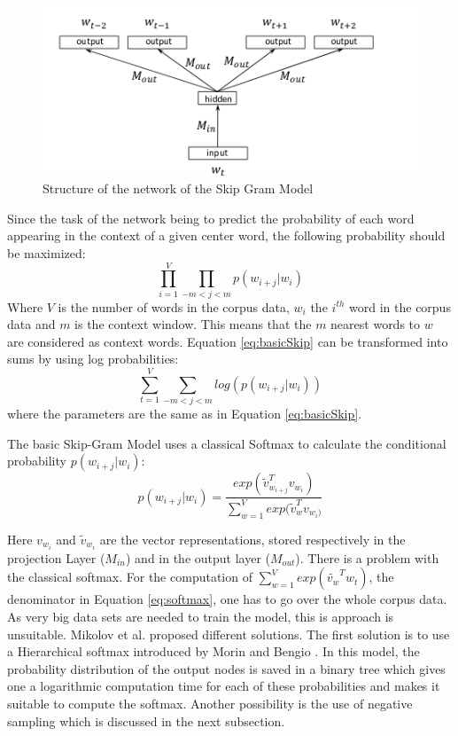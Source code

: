 \begin{figure}[ht]
\centering
\includegraphics[scale=0.625]{images/ntw_architecture}
\caption{Structure of the network of the Skip Gram Model}
\label{fig:ntw_architecture}
\end{figure}
Since the task of the network being to predict the probability of each word appearing in the context of a given center word, the following probability should be maximized:\\
\begin{equation} \label{eq:basicSkip}
\prod_{i=1}^V \prod_{-m<j<m} p(w_{i+j}|w_i)
\end{equation}
Where $V$ is the number of words in the corpus data, $w_i$ the $i^{th}$ word in the corpus data and $m$ is the context window. This means that the $m$ nearest words to $w$ are considered as context words.
Equation \ref{eq:basicSkip} can be transformed into sums by using log probabilities:
\begin{equation}
\sum _{t=1}^V \sum_{-m<j<m} log( p(w_{i+j}|w_i) )
\end{equation}
where the parameters are the same as in Equation \ref{eq:basicSkip}.

The basic Skip-Gram Model uses a classical Softmax to calculate the conditional probability $p(w_{i+j}|w_i)$:
\begin{equation} \label{eq:softmax}
p(w_{i+j}|w_i)= \frac{exp( \tilde{v}_{w_{i+j}}^Tv_{w_i})}{\sum_{w=1}^V exp(\tilde{v}_w^Tv_{ w_i)}}
\end{equation}

Here $ v_{w_i}$ and $\tilde{v}_{w_i}$ are the vector representations, stored respectively in the projection Layer ($M_{in}$) and in the output layer ($M_{out}$). There is a problem with the classical softmax. For the computation of $\sum_{w=1}^V exp(\tilde{v_w}^T w_t)$, the denominator in Equation \ref{eq:softmax}, one has to go over the whole corpus data. As very big data sets are needed to train the model, this is approach is unsuitable. Mikolov et al. \citep{mikolov2} proposed different solutions. The first solution is to use a Hierarchical softmax introduced by Morin and Bengio \citep{hsoftmax}. In this model, the probability distribution of the output nodes is saved in a binary tree which gives one a logarithmic computation time for each of these probabilities and makes it suitable to compute the softmax. Another possibility is the use of negative sampling which is discussed in the next subsection.


